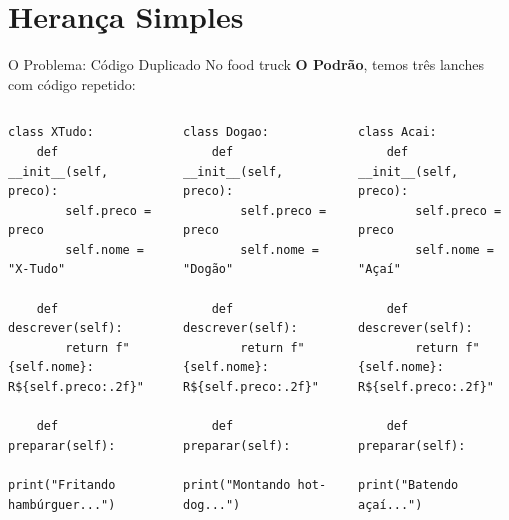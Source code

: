 \documentclass[aspectratio=169]{beamer}
\begin{document}

\section{Herança Simples}

\begin{frame}[fragile]{O Problema: Código Duplicado}
  No food truck \textbf{O Podrão}, temos três lanches com código repetido:

  \begin{columns}[T]
    \begin{lstlisting}
class XTudo:
    def __init__(self, preco):
        self.preco = preco
        self.nome = "X-Tudo"

    def descrever(self):
        return f"{self.nome}: R${self.preco:.2f}"

    def preparar(self):
        print("Fritando hambúrguer...")
    \end{lstlisting}

    \begin{lstlisting}
class Dogao:
    def __init__(self, preco):
        self.preco = preco
        self.nome = "Dogão"

    def descrever(self):
        return f"{self.nome}: R${self.preco:.2f}"

    def preparar(self):
        print("Montando hot-dog...")
    \end{lstlisting}

    \begin{lstlisting}
class Acai:
    def __init__(self, preco):
        self.preco = preco
        self.nome = "Açaí"

    def descrever(self):
        return f"{self.nome}: R${self.preco:.2f}"

    def preparar(self):
        print("Batendo açaí...")
    \end{lstlisting}
  \end{columns}
\end{frame}
\end{document}
